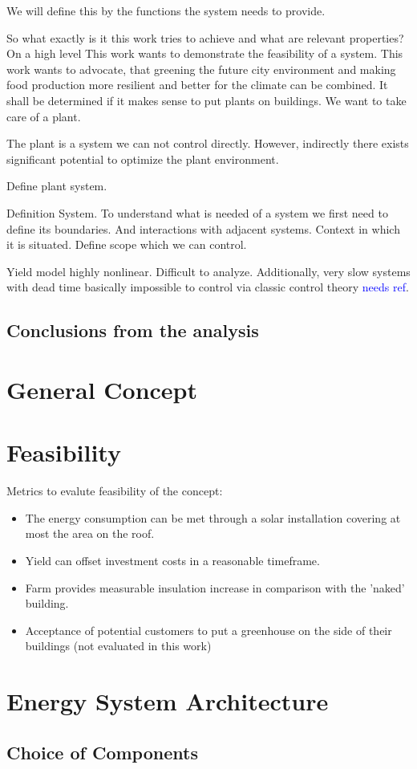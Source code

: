 We will define this by the functions the system needs to provide.

So what exactly is it this work tries to achieve and what are relevant properties?
On a high level
This work wants to demonstrate the feasibility of a system.
This work wants to advocate, that greening the future city environment and making food production more resilient and better for the climate can be combined.
It shall be determined if it makes sense to put plants on buildings.
We want to take care of a plant.

The plant is a system we can not control directly.
However, indirectly there exists significant potential to optimize the plant environment.

Define plant system.

Definition System.
To understand what is needed of a system we first need to define its boundaries.
And interactions with adjacent systems.
Context in which it is situated.
Define scope which we can control.

Yield model highly nonlinear.
Difficult to analyze.
Additionally, very slow systems with dead time basically impossible to control via classic control theory \textcolor{Blue}{needs ref}.

\subsection{Conclusions from the analysis}
\label{sub:conc-analysis}



\section{General Concept}
\label{sec:concept}
\section{Feasibility}
\label{sec:feasibility}
Metrics to evalute feasibility of the concept:
\begin{itemize}
	\item The energy consumption can be met through a solar installation covering at most the area on the roof.
	\item Yield can offset investment costs in a reasonable timeframe.
	\item Farm provides measurable insulation increase in comparison with the 'naked' building.
	\item Acceptance of potential customers to put a greenhouse on the side of their buildings (not evaluated in this work)
\end{itemize}

\section{Energy System Architecture}
\label{sec:architecture}

\subsection{Choice of Components}

